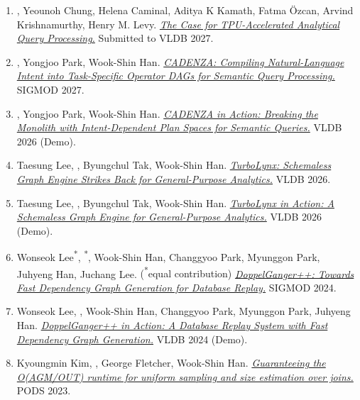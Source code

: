 \documentclass[10pt, letterpaper]{article}
\begin{document}
\begin{enumerate}[leftmargin=0.6cm, itemsep=1.5ex]
    \item {}, Yeounoh Chung, Helena Caminal, Aditya K Kamath, Fatma \"{O}zcan, Arvind Krishnamurthy, Henry M. Levy.
    \href{https://arxiv.org/abs/2610.22673}{\textit{The Case for TPU-Accelerated Analytical Query Processing.}} Submitted to VLDB 2027.

    \item {}, Yongjoo Park, Wook-Shin Han.
    \href{https://doi.org/10.1145/3837103}{\textit{CADENZA: Compiling Natural-Language Intent into Task-Specific Operator DAGs for Semantic Query Processing.}} SIGMOD 2027.

    \item {}, Yongjoo Park, Wook-Shin Han.
    \href{https://doi.org/10.14778/3827998.3828084}{\textit{CADENZA in Action: Breaking the Monolith with Intent-Dependent Plan Spaces for Semantic Queries.}} VLDB 2026 (Demo).

    \item Taesung Lee, , Byungchul Tak, Wook-Shin Han.
    \href{https://doi.org/10.14778/3797919.3797932}{\textit{TurboLynx: Schemaless Graph Engine Strikes Back for General-Purpose Analytics.}} VLDB 2026.

    \item Taesung Lee, , Byungchul Tak, Wook-Shin Han.
    \href{https://doi.org/10.14778/3827998.3828133}{\textit{TurboLynx in Action: A Schemaless Graph Engine for General-Purpose Analytics.}} VLDB 2026 (Demo).

    \item Wonseok Lee\textsuperscript{*}, \textsuperscript{*}, Wook-Shin Han, Changgyoo Park, Myunggon Park, Juhyeng Han, Juchang Lee. \textnormal{(\textsuperscript{*}equal contribution)}
    \href{https://doi.org/10.1145/3639322}{\textit{DoppelGanger++: Towards Fast Dependency Graph Generation for Database Replay.}} SIGMOD 2024.

    \item Wonseok Lee, , Wook-Shin Han, Changgyoo Park, Myunggon Park, Juhyeng Han.
    \href{https://doi.org/10.14778/3685800.3685863}{\textit{DoppelGanger++ in Action: A Database Replay System with Fast Dependency Graph Generation.}} VLDB 2024 (Demo).

    \item Kyoungmin Kim, , George Fletcher, Wook-Shin Han.
    \href{https://doi.org/10.1145/3584372.3588676}{\textit{Guaranteeing the O(AGM/OUT) runtime for uniform sampling and size estimation over joins.}} PODS 2023.
\end{enumerate}
\end{document}
